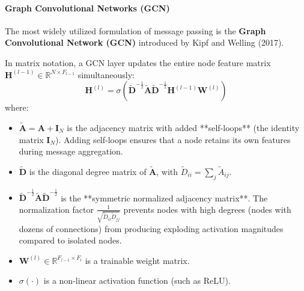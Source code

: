 \paragraph{Graph Convolutional Networks (GCN)}
The most widely utilized formulation of message passing is the \textbf{Graph Convolutional Network (GCN)} introduced by Kipf and Welling (2017). 

In matrix notation, a GCN layer updates the entire node feature matrix $\mathbf{H}^{(l-1)} \in \mathbb{R}^{N \times F_{l-1}}$ simultaneously:
\begin{equation}
\mathbf{H}^{(l)} = \sigma\left( \mathbf{\tilde{D}}^{-\frac{1}{2}} \mathbf{\tilde{A}} \mathbf{\tilde{D}}^{-\frac{1}{2}} \mathbf{H}^{(l-1)} \mathbf{W}^{(l)} \right)\label{eq:gcn_layer}
\end{equation}
where:
\begin{itemize}
    \item $\mathbf{\tilde{A}} = \mathbf{A} + \mathbf{I}_N$ is the adjacency matrix with added **self-loops** (the identity matrix $\mathbf{I}_N$). Adding self-loops ensures that a node retains its own features during message aggregation.
    \item $\mathbf{\tilde{D}}$ is the diagonal degree matrix of $\mathbf{\tilde{A}}$, with $\tilde{D}_{ii} = \sum_{j} \tilde{A}_{ij}$.
    \item $\mathbf{\tilde{D}}^{-\frac{1}{2}} \mathbf{\tilde{A}} \mathbf{\tilde{D}}^{-\frac{1}{2}}$ is the **symmetric normalized adjacency matrix**. The normalization factor $\frac{1}{\sqrt{\tilde{D}_{ii} \tilde{D}_{jj}}}$ prevents nodes with high degrees (nodes with dozens of connections) from producing exploding activation magnitudes compared to isolated nodes.
    \item $\mathbf{W}^{(l)} \in \mathbb{R}^{F_{l-1} \times F_l}$ is a trainable weight matrix.
    \item $\sigma(\cdot)$ is a non-linear activation function (such as ReLU).
\end{itemize}

